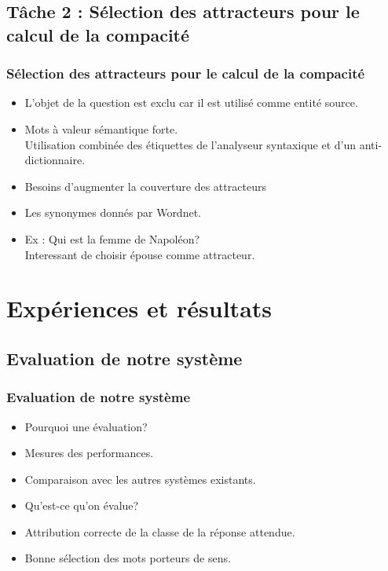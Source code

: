 \documentclass[xcolor=dvipsnames]{beamer}
\begin{document}
\subsection{Tâche 2 : Sélection des attracteurs pour le calcul de la compacité}
\frame
{
    \frametitle{Sélection des attracteurs pour le calcul de la compacité}
    \begin{itemize}
        \item<1-> L'objet de la question est exclu car il est utilisé comme entité source.
        \item<2-> Mots à valeur sémantique forte. \\
            Utilisation combinée des étiquettes de l'analyseur syntaxique et d'un anti-dictionnaire.
        \item<3-> Besoins d'augmenter la couverture des attracteurs 
        \item<4-> Les synonymes donnés par Wordnet.
        \item<5-> Ex : Qui est la femme de Napoléon?\\
            Interessant de choisir épouse comme attracteur.
    \end{itemize}
}

\section{Expériences et résultats}
\subsection{Evaluation de notre système}
\frame
{
  \frametitle{Evaluation de notre système}
  \begin{itemize}
    \item<1-> Pourquoi une évaluation?
    \item<2-> Mesures des performances.
    \item<3-> Comparaison avec les autres systèmes existants.
    \item<4-> Qu'est-ce qu'on évalue?
    \item<5-> Attribution correcte de la classe de la réponse attendue.
    \item<6-> Bonne sélection des mots porteurs de sens.
  \end{itemize}
}
\end{document}
